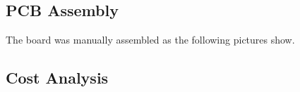 	\subsection{PCB Assembly}\label{ssec:pcb-assembly}

		The board was manually assembled as the following pictures show.

	\subsection{Cost Analysis}

